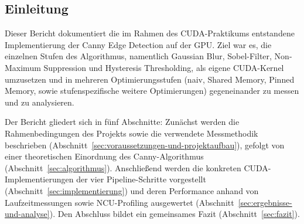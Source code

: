 \subsection{Einleitung}
\label{subsec:introduction}

Dieser Bericht dokumentiert die im Rahmen des CUDA-Praktikums entstandene
Implementierung der Canny Edge Detection auf der GPU. Ziel war es, die
einzelnen Stufen des Algorithmus, namentlich Gaussian Blur, Sobel-Filter,
Non-Maximum Suppression und Hysteresis Thresholding, als eigene
CUDA-Kernel umzusetzen und in mehreren Optimierungsstufen (naiv, Shared
Memory, Pinned Memory, sowie stufenspezifische weitere Optimierungen)
gegeneinander zu messen und zu analysieren.

Der Bericht gliedert sich in fünf Abschnitte: Zunächst werden die
Rahmenbedingungen des Projekts sowie die verwendete Messmethodik
beschrieben (Abschnitt~\ref{sec:voraussetzungen-und-projektaufbau}),
gefolgt von einer theoretischen Einordnung des Canny-Algorithmus
(Abschnitt~\ref{sec:algorithmus}). Anschließend werden die konkreten
CUDA-Implementierungen der vier Pipeline-Schritte vorgestellt
(Abschnitt~\ref{sec:implementierung}) und deren Performance anhand von
Laufzeitmessungen sowie NCU-Profiling ausgewertet
(Abschnitt~\ref{sec:ergebnisse-und-analyse}). Den Abschluss bildet ein
gemeinsames Fazit (Abschnitt~\ref{sec:fazit}).